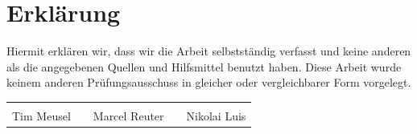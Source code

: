 
\FloatBarrier

\FloatBarrier


\chapter{Erklärung}
Hiermit erklären wir, dass wir die Arbeit selbstständig verfasst und keine
anderen als die angegebenen Quellen und Hilfsmittel benutzt haben. Diese Arbeit
wurde keinem anderen Prüfungsausschuss in gleicher oder vergleichbarer Form
vorgelegt.

\vspace{10ex}
{\centering
\renewcommand{\arraystretch}{0.9}
\begin{tabular}{p{}p{}p{}p{}p{}}
  \dotfill                    & & \dotfill                      & & \dotfill \\
  \centering\footnotesize{Tim Meusel}& & \centering\footnotesize{Marcel Reuter}& & \centering\footnotesize{Nikolai Luis}%
\end{tabular}
}


